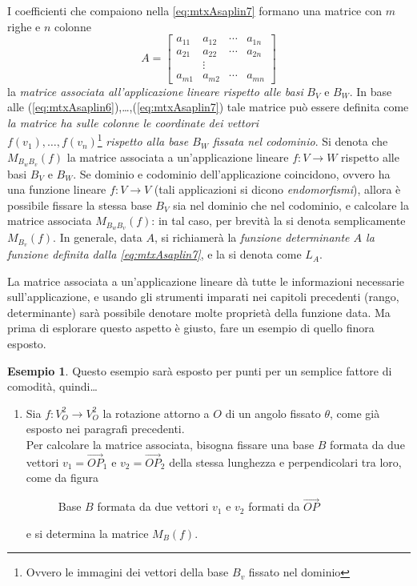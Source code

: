 \documentclass{book}
\theoremstyle{definition}
\newtheorem{es}{Esempio}[section]
\theoremstyle{plain}
\begin{document}
I coefficienti che compaiono nella \ref{eq:mtxAsaplin7} formano una
matrice con $m$ righe e $n$ colonne
\begin{equation*}
  A=
  \begin{bmatrix}
    a_{11} & a_{12} & \cdots & a_{1n}\\
    a_{21} & a_{22} & \cdots & a_{2n}\\
           & \vdots\\
    a_{m1} & a_{m2} & \cdots & a_{mn}
  \end{bmatrix}
\end{equation*}
la \emph{matrice associata all'applicazione lineare rispetto alle basi}
$B_V$ e $B_W$. In base alle
(\ref{eq:mtxAsaplin6}),\dots,(\ref{eq:mtxAsaplin7}) tale matrice può
essere definita come \emph{la matrice ha sulle colonne le coordinate dei
  vettori\\ $f(v_1),\dots,f(v_n)$}\footnote{Ovvero le immagini dei vettori
  della base $B_v$ fissato nel dominio} \emph{rispetto alla base $B_W$
  fissata nel codominio}. Si denota che $M_{B_w B_v}(f)$ la matrice
associata a un'applicazione lineare $f:V\to W$ rispetto alle basi $B_V$
e $B_W$. Se dominio e codominio dell'applicazione coincidono, ovvero ha
una funzione lineare $f:V\to V$ (tali applicazioni si dicono
\emph{endomorfismi}), allora è possibile fissare la stessa base $B_V$
sia nel dominio che nel codominio, e calcolare la matrice associata
$M_{B_w B_v} (f)$: in tal caso, per brevità la si denota semplicamente
$M_{B_v} (f)$. In generale, data $A$, si richiamerà la \emph{funzione
  determinante $A$ la funzione definita dalla \ref{eq:mtxAsaplin7}}, e
la si denota come $L_A$.

La matrice associata a un'applicazione lineare dà tutte le informazioni
necessarie sull'applicazione, e usando gli strumenti imparati nei capitoli
precedenti (rango, determinante) sarà possibile denotare molte proprietà
della funzione data. Ma prima di esplorare questo aspetto è giusto, fare un
esempio di quello finora esposto.
\begin{es}
  \label{es:mtxAsaplin1}
  Questo esempio sarà esposto per punti per un semplice fattore di
  comodità, quindi\dots
  \begin{enumerate}
  \item Sia $f:V_O^2\to V_O^2$ la rotazione attorno a $O$ di un angolo
    fissato $\theta$, come già esposto nei paragrafi precedenti.\\
    Per calcolare la matrice associata, bisogna fissare una base $B$
    formata da due vettori $v_1=\vec{OP}_1$ e $v_2=\vec{OP}_2$ della
    stessa lunghezza e perpendicolari tra loro, come da figura
    \begin{figure}[ht!]
      \centering
      \resizebox{8cm}{!}{}
      \caption{Base $B$ formata da due vettori $v_1$ e $v_2$ formati da $\vec{OP}$}
      \label{fig:mtxAsaplin1}
    \end{figure}
    e si determina la matrice $M_B(f)$.
    
  \end{enumerate}
\end{es}
\end{document}

